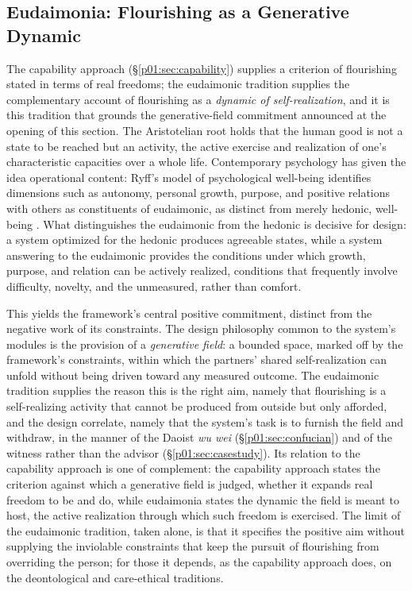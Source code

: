 \subsection{Eudaimonia: Flourishing as a Generative Dynamic}\label{p01:sec:eudaimonia}

The capability approach (§\ref{p01:sec:capability}) supplies a criterion of flourishing stated in terms of real freedoms; the eudaimonic tradition supplies the complementary account of flourishing as a \emph{dynamic of self-realization}, and it is this tradition that grounds the generative-field commitment announced at the opening of this section. The Aristotelian root holds that the human good is not a state to be reached but an activity, the active exercise and realization of one's characteristic capacities over a whole life. Contemporary psychology has given the idea operational content: Ryff's model of psychological well-being identifies dimensions such as autonomy, personal growth, purpose, and positive relations with others as constituents of eudaimonic, as distinct from merely hedonic, well-being \parencite{ryff1995structure}. What distinguishes the eudaimonic from the hedonic is decisive for design: a system optimized for the hedonic produces agreeable states, while a system answering to the eudaimonic provides the conditions under which growth, purpose, and relation can be actively realized, conditions that frequently involve difficulty, novelty, and the unmeasured, rather than comfort.

This yields the framework's central positive commitment, distinct from the negative work of its constraints. The design philosophy common to the system's modules is the provision of a \emph{generative field}: a bounded space, marked off by the framework's constraints, within which the partners' shared self-realization can unfold without being driven toward any measured outcome. The eudaimonic tradition supplies the reason this is the right aim, namely that flourishing is a self-realizing activity that cannot be produced from outside but only afforded, and the design correlate, namely that the system's task is to furnish the field and withdraw, in the manner of the Daoist \emph{wu wei} (§\ref{p01:sec:confucian}) and of the witness rather than the advisor (§\ref{p01:sec:casestudy}). Its relation to the capability approach is one of complement: the capability approach states the criterion against which a generative field is judged, whether it expands real freedom to be and do, while eudaimonia states the dynamic the field is meant to host, the active realization through which such freedom is exercised. The limit of the eudaimonic tradition, taken alone, is that it specifies the positive aim without supplying the inviolable constraints that keep the pursuit of flourishing from overriding the person; for those it depends, as the capability approach does, on the deontological and care-ethical traditions.

